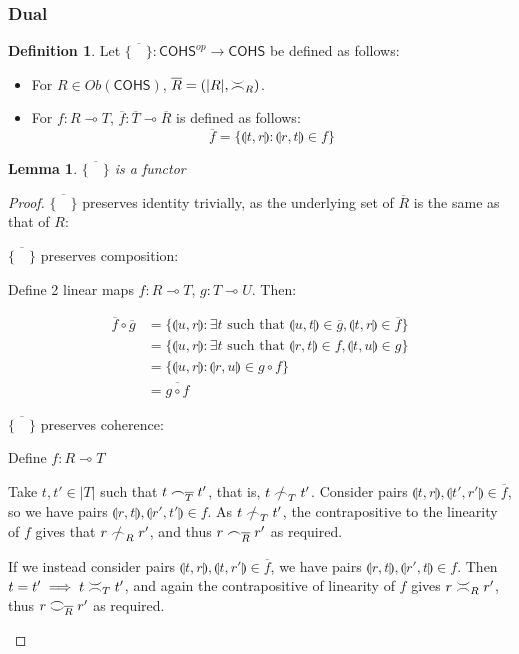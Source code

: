 \documentclass[11pt, oneside]{article}
\theoremstyle{plain}
\newtheorem{lemma}[theorem]{Lemma}
\theoremstyle{definition}
\newtheorem{definition}[theorem]{Definition}
\newcommand{\lp}{\llparenthesis}
\newcommand{\rp}{\rrparenthesis}
\newcommand{\cohs}{{\mathsf{COHS}}}
\newcommand{\coh}[1][]{\mathrel{\vcenter{\offinterlineskip\hbox{$\frown$}\vskip0.2ex\hbox{$\smile$}}_{\ifx\\#1\\\else#1\fi}}}
\newcommand{\incoh}[1][]{\mathrel{\vcenter{\offinterlineskip\hbox{$\smile$}\vskip0.2ex\hbox{$\frown$}}_{\ifx\\#1\\\else#1\fi}}}
\newcommand{\scoh}[1][]{\mathrel{\frown}_{\ifx\\#1\\\else#1\fi}}
\newcommand{\notscoh}[1][]{\mathrel{\ooalign{$\frown$\cr\hidewidth$/$\hidewidth}}_{\ifx\\#1\\\else#1\fi}}
\newcommand{\comp}{\mathbin{\circ}}
\begin{document}
\subsubsection{Dual}
\begin{definition}
    Let $\overline{\{\quad\}}:\cohs^{op}\to\cohs$ be defined as follows:
    \begin{itemize}
        \item
        For $R\in Ob(\cohs)$, $\overline{R}=(|R|,\incoh[R])$.

        \item
        For $f:R\multimap T$, $\overline{f}:\overline{T}\multimap\overline{R}$ is defined as follows:
        $$\overline{f}=\{\lp t,r\rp:\lp r,t\rp\in f\}$$
    \end{itemize}
\end{definition}

\begin{lemma}
    $\overline{\{\quad\}}$ is a functor
\end{lemma}

\begin{proof}
    $\overline{\{\quad\}}$ preserves identity trivially, as the underlying set of $\overline{R}$ is the same as that of $R$:

    $\overline{\{\quad\}}$ preserves composition:
    \begin{adjustwidth}{1.5em}{}
        Define 2 linear maps $f:R\multimap T$, $g:T\multimap U$. Then:
    \end{adjustwidth}
    \begin{align*}
        \overline{f}\comp\overline{g} &= \{\lp u,r\rp:\exists t \text{ such that } \lp u,t\rp\in \overline{g},\lp t,r\rp\in \overline{f}\} \\
        &= \{\lp u,r\rp:\exists t \text{ such that } \lp r,t\rp\in f,\lp t,u\rp\in g\} \\
        &= \{\lp u,r\rp:\lp r,u\rp\in g\comp f\} \\
        &= \overline{g\comp f}
    \end{align*}

    $\overline{\{\quad\}}$ preserves coherence:
    \begin{adjustwidth}{1.5em}{}
        Define $f:R\multimap T$

        Take $t,t'\in|T|$ such that $t\scoh[\overline{T}]t'$, that is, $t\notscoh[T]t'$.
        Consider pairs $\lp t,r\rp,\lp t',r'\rp\in\overline{f}$, so we have pairs $\lp r,t\rp,\lp r',t'\rp\in f$.
        As $t\notscoh[T]t'$, the contrapositive to the linearity of $f$ gives that $r\notscoh[R]r'$, and thus $r\scoh[\overline{R}]r'$ as required.

        If we instead consider pairs $\lp t,r\rp,\lp t,r'\rp\in\overline{f}$, we have pairs $\lp r,t\rp,\lp r',t\rp\in f$.
        Then $t=t'\implies t\incoh[T]t'$, and again the contrapositive of linearity of $f$ gives $r\incoh[R]r'$, thus $r\coh[\overline{R}]r'$ as required.

    \end{adjustwidth}

\end{proof}
\end{document}
